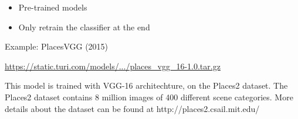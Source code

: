 
\begin{frame}
  \begin{itemize}
  \item Pre-trained models
  \item Only retrain the classifier at the end
  \end{itemize}
\end{frame}

\begin{frame}
  Example: PlacesVGG (2015)

  \vspace{5mm}
  

  \url{https://static.turi.com/models/.../places_vgg_16-1.0.tar.gz}
  
  This model is trained with VGG-16 architechture, on the Places2
  dataset. The Places2 dataset contains 8 million images of 400
  different scene categories. More details about the dataset can be
  found at http://places2.csail.mit.edu/

  \vfill
\end{frame}



